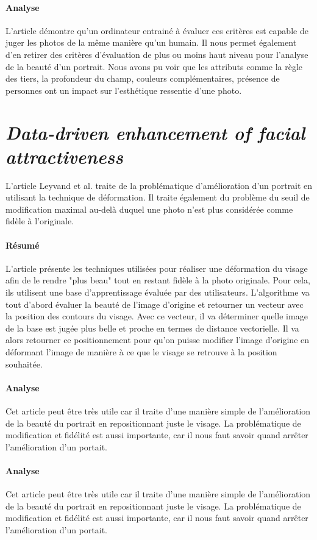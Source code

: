 \documentclass[11pt, french]{report-rd-info}
\begin{document}
\paragraph{Analyse}
L'article démontre qu'un ordinateur entrainé à évaluer ces critères est capable de juger les photos de la même manière qu'un humain.
Il nous permet également d'en retirer des critères d'évaluation de plus ou moins haut niveau pour l'analyse de la beauté d'un portrait.
Nous avons pu voir que les attributs comme la règle des tiers, la profondeur du champ, couleurs complémentaires, présence de personnes ont un impact sur l'esthétique ressentie d'une photo.
\section{\emph{Data-driven enhancement of facial attractiveness}}
L'article Leyvand et al. \cite{Leyvand2008} traite de la problématique d'amélioration d'un portrait en utilisant la technique de déformation. Il traite également du problème du seuil de modification maximal au-delà duquel une photo n'est plus considérée comme fidèle à l'originale.
\paragraph{Résumé}
L'article présente les techniques utilisées pour réaliser une déformation du visage afin de le rendre  "plus beau" tout en restant fidèle à la photo originale. Pour cela, ils utilisent une base d'apprentissage évaluée par des utilisateurs.
L'algorithme va tout d'abord évaluer la beauté de l'image d'origine et retourner un vecteur avec la position des contours du visage. Avec ce vecteur, il va déterminer quelle image de la base est jugée plus belle et proche en termes de distance vectorielle. Il va alors retourner ce positionnement pour qu'on puisse modifier l'image d'origine en déformant l'image de manière à ce que le visage se retrouve à la position souhaitée.
\paragraph{Analyse}
Cet article peut être très utile car il traite d'une manière simple de l'amélioration de la beauté du portrait en repositionnant juste le visage. La problématique de modification et fidélité est aussi importante, car il nous faut savoir quand arrêter l'amélioration d'un portait.
\paragraph{Analyse}
Cet article peut être très utile car il traite d'une manière simple de l'amélioration de la beauté du portrait en repositionnant juste le visage. La problématique de modification et fidélité est aussi importante, car il nous faut savoir quand arrêter l'amélioration d'un portait.
\end{document}
